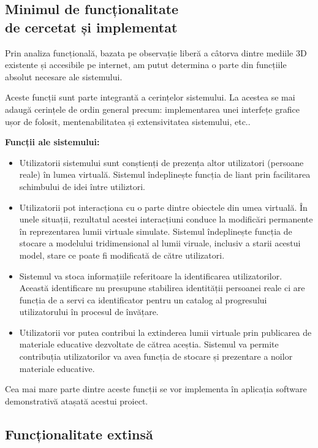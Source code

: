 \subsection{Minimul de funcționalitate \\ de cercetat și implementat}
\par Prin analiza funcțională, bazata pe observație liberă a câtorva dintre mediile 3D existente și accesibile pe internet, am putut determina  o parte din funcțiile absolut necesare ale sistemului.
\par Aceste funcții sunt parte integrantă a cerințelor sistemului. La acestea se mai adaugă cerințele de ordin general precum: implementarea unei interfețe grafice ușor de folosit, mentenabilitatea și extensivitatea sistemului, etc.. \\
\par \textbf{Funcții ale sistemului:}
\begin{itemize}
\item Utilizatorii sistemului sunt conștienți de prezența altor utilizatori (persoane reale) în lumea virtuală. Sistemul îndeplinește funcția de liant prin facilitarea schimbului de idei între utiliztori.
\item Utilizatorii pot interacționa cu o parte dintre obiectele din umea virtuală. În unele situații, rezultatul acestei interacțiuni conduce la modificări permanente în reprezentarea lumii virtuale simulate. Sistemul îndeplinește funcția de stocare a modelului tridimensional al lumii viruale, inclusiv a starii acestui model, stare ce poate fi modificată de către utilizatori.
\item Sistemul va stoca informațiile referitoare la identificarea utilizatorilor. Această identificare nu presupune stabilirea identității persoanei reale ci are funcția de a servi ca identificator pentru un catalog al progresului utilizatorului în procesul de învățare.
\item Utilizatorii vor putea contribui la extinderea lumii virtuale prin publicarea de materiale educative dezvoltate de cătrea aceștia. Sistemul va permite contribuția utilizatorilor va avea funcția de stocare și prezentare a noilor materiale educative.
\end{itemize}

\par Cea mai mare parte dintre aceste funcții se vor implementa în aplicația software demonstrativă atașată acestui proiect.

\subsection{Funcționalitate extinsă}

